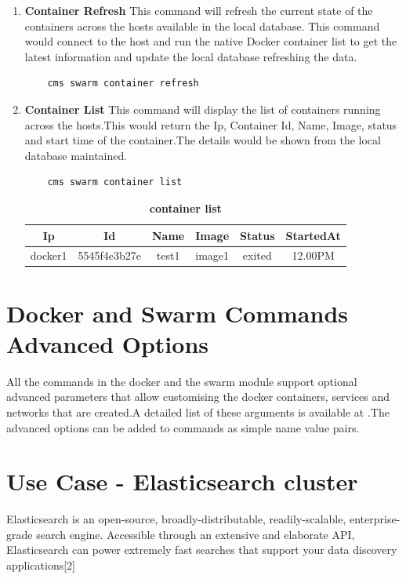 \documentclass[9pt,twocolumn,twoside]{../../styles/osajnl}
\begin{document}
\begin{enumerate}
    \item \textbf{Container Refresh}
    This command will refresh the current state of the containers across the hosts available in the local database. This command would connect to the host and run the native Docker container list to get the latest information and update the local database  refreshing the data.
    \begin{verbatim}
    cms swarm container refresh
    \end{verbatim} 
    \item \textbf{Container List}
    This command will display the list of containers running across the hosts.This would return the Ip, Container Id, Name, Image, status and start time of the container.The details would be shown from the local database maintained.
    \begin{verbatim}
    cms swarm container list
    \end{verbatim}    
     \begin{table}[htbp]
     \caption{\bf container list }
     \begin{tabular}{cccccc}
     \hline
      Ip & Id & Name & Image &Status&StartedAt\\
      \hline
      docker1 & 5545f4e3b27e & test1 & image1 &exited & 12.00PM \\
     \hline
     \end{tabular}
     \label{tab:tab10}
     \end{table}
\end{enumerate}

 \section{Docker and Swarm Commands Advanced Options}

All the commands in the docker and the swarm module support optional advanced parameters that allow customising the docker containers, services and networks that are created.A detailed list of these arguments is available at \cite{Docker-Python-SDK}.The advanced options can be added to commands as simple name value pairs.

\section{Use Case - Elasticsearch cluster }
 Elasticsearch\cite{www-ElasticSearch} is an open-source, broadly-distributable, readily-scalable, enterprise-grade search engine. Accessible through an extensive and elaborate API, Elasticsearch can power extremely fast searches that support your data discovery applications[2]
\end{document}

